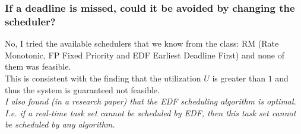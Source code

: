 \documentclass{article}
\begin{document}
\subsubsection{If a deadline is missed, could it be avoided by changing the scheduler?}
No, I tried the available schedulers that we know from the class:
RM (Rate Monotonic, FP Fixed Priority and EDF Earliest Deadline First)
and none of them was feasible. \\
This is consistent with the finding that the utilization $U$ is greater than $1$ and thus the system is guaranteed not feasible. \\
\textsl{I also found (in a research paper) that the EDF scheduling algorithm is optimal.
I.e. if a real-time task set cannot be scheduled by EDF,
then this task set cannot be scheduled by any algorithm.}
\end{document}
